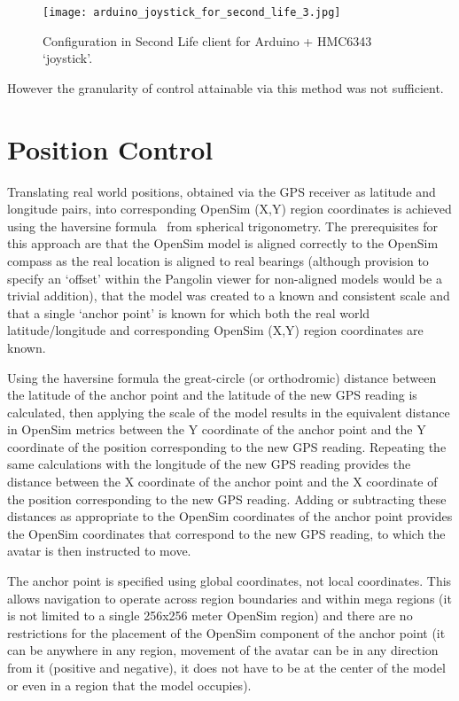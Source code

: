 \begin{figure}[h]
\centering
  \texttt{[image: arduino\_joystick\_for\_second\_life\_3.jpg]}
  \caption{Configuration in Second Life client for Arduino + HMC6343 `joystick'.}
  \label{arduino_joystick_for_second_life_3.jpg}
\end{figure}

However the granularity of control attainable via this method was not sufficient.


\section{Position Control}

Translating real world positions, obtained via the GPS receiver as latitude and longitude pairs, into corresponding OpenSim (X,Y) region coordinates is achieved using the haversine formula~\cite{Gellert1989} from spherical trigonometry. The prerequisites for this approach are that the OpenSim model is aligned correctly to the OpenSim compass as the real location is aligned to real bearings (although provision to specify an `offset' within the Pangolin viewer for non-aligned models would be a trivial addition), that the model was created to a known and consistent scale and that a single `anchor point' is known for which both the real world latitude/longitude and corresponding OpenSim (X,Y) region coordinates are known.

Using the haversine formula the great-circle (or orthodromic) distance between the latitude of the anchor point and the latitude of the new GPS reading is calculated, then applying the scale of the model results in the equivalent distance in OpenSim metrics between the Y coordinate of the anchor point and the Y coordinate of the position corresponding to the new GPS reading. Repeating the same calculations with the longitude of the new GPS reading provides the distance between the X coordinate of the anchor point and the X coordinate of the position corresponding to the new GPS reading. Adding or subtracting these distances as appropriate to the OpenSim coordinates of the anchor point provides the OpenSim coordinates that correspond to the new GPS reading, to which the avatar is then instructed to move.

The anchor point is specified using global coordinates, not local coordinates. This allows navigation to operate across region boundaries and within mega regions (it is not limited to a single 256x256 meter OpenSim region) and there are no restrictions for the placement of the OpenSim component of the anchor point (it can be anywhere in any region, movement of the avatar can be in any direction from it (positive and negative), it does not have to be at the center of the model or even in a region that the model occupies).

